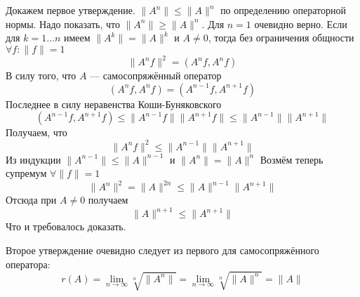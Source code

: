 \documentclass[12pt]{article}
\begin{document}
\begin{Proof}
    Докажем первое утверждение.
    $\|A^n\| \le \|A\|^n$ по определению операторной нормы.
    Надо показать, что $\|A^n\| \ge \|A\|^n$.
    Для $n = 1$ очевидно верно.
    Если для $k = 1 \dots n$ имеем $\|A^k\| = \|A\|^k$ и $A \ne 0$, тогда 
    без ограничения общности $\forall f: \|f\| = 1$
    $$
    \|A^n f\|^2 = (A^n f, A^n f)
    $$
    В силу того, что $A$ --- самосопряжённый оператор
    $$
    (A^n f, A^n f) = (A^{n - 1} f, A^{n + 1} f)
    $$
    Последнее в силу неравенства Коши-Буняковского
    $$
    (A^{n - 1} f, A^{n + 1} f) \le \|A^{n - 1}f\| \|A^{n + 1} f\| 
    \le \|A^{n - 1}\| \|A^{n + 1}\|
    $$
    Получаем, что
    $$
    \|A^n f\|^2 \le \|A^{n - 1}\| \|A^{n + 1}\|
    $$
    Из индукции $\|A^{n - 1}\| \le \|A\|^{n -1}$ и $\|A^n\| = \|A\|^n$
    Возмём теперь супремум $\forall \|f\| = 1$
    $$
    \|A^n\|^2 = \|A\|^{2n} \le \|A\|^{n - 1} \|A^{n + 1}\|
    $$
    Отсюда при $A \ne 0$ получаем
    $$
    \|A\|^{n + 1} \le \|A^{n + 1}\|
    $$
    Что и требовалось доказать.

    Второе утверждение очевидно следует из первого для самосопряжённого
    оператора:
    $$
    r(A) = \lim_{n \to \infty} \sqrt[n]{\|A^n\|} = \lim_{n \to \infty}
    \sqrt[n]{\|A\|^n} = \|A\|
    $$


\end{Proof}
\end{document}

